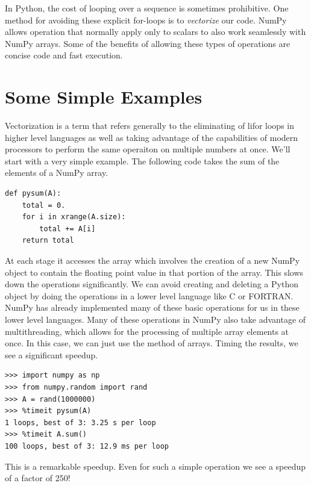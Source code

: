 \label{lab:Python_Vectorization}

In Python, the cost of looping over a sequence is sometimes prohibitive.
One method for avoiding these explicit for-loops is to \emph{vectorize} our code.
NumPy allows operation that normally apply only to scalars to also work seamlessly with NumPy arrays.
Some of the benefits of allowing these types of operations are concise code and fast execution.

\section*{Some Simple Examples}

Vectorization is a term that refers generally to the eliminating of li{for} loops in higher level languages as well as taking advantage of the capabilities of modern processors to perform the same operaiton on multiple numbers at once.
We'll start with a very simple example.
The following code takes the sum of the elements of a NumPy array.
\begin{lstlisting}
def pysum(A):
    total = 0.
    for i in xrange(A.size):
        total += A[i]
    return total
\end{lstlisting}
At each stage it accesses the array which involves the creation of a new NumPy object to contain the floating point value in that portion of the array.
This slows down the operations significantly.
We can avoid creating and deleting a Python object by doing the operations in a lower level language like C or FORTRAN.
NumPy has already implemented many of these basic operations for us in these lower level languages.
Many of these operations in NumPy also take advantage of multithreading, which allows for the processing of multiple array elements at once.
In this case, we can just use the  method of arrays.
Timing the results, we see a significant speedup.
\begin{lstlisting}
>>> import numpy as np
>>> from numpy.random import rand
>>> A = rand(1000000)
>>> %timeit pysum(A)
1 loops, best of 3: 3.25 s per loop
>>> %timeit A.sum()
100 loops, best of 3: 12.9 ms per loop
\end{lstlisting}
This is a remarkable speedup.
Even for such a simple operation we see a speedup of a factor of 250!

